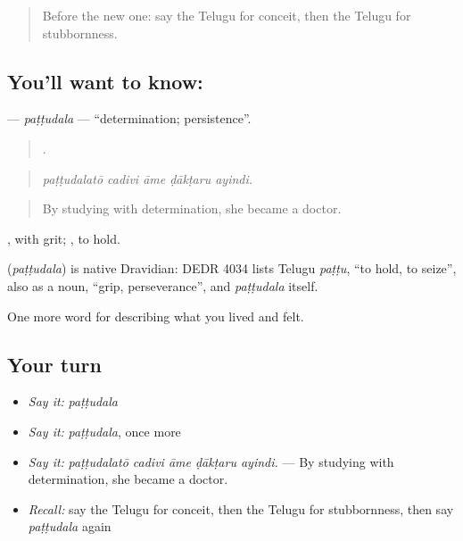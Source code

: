 \label{lesson:TE-C508-pattudala}



\begin{quote}
Before the new one: say the Telugu for conceit, then the Telugu for stubbornness.
\end{quote}

\subsection*{You'll want to know: }
\textbf{} — \emph{paṭṭudala} — \textquotedblleft{}determination; persistence\textquotedblright{}.

\begin{quote}
    .
\end{quote}

\begin{quote}
\emph{paṭṭudalatō cadivi āme ḍākṭaru ayindi.}
\end{quote}

\begin{quote}
By studying with determination, she became a doctor.
\end{quote}

, with grit; , to hold.

\begin{cousinweb}
\textbf{} (\emph{paṭṭudala}) is native Dravidian: DEDR 4034 lists Telugu \emph{paṭṭu}, \textquotedblleft{}to hold, to seize\textquotedblright{}, also as a noun, \textquotedblleft{}grip, perseverance\textquotedblright{}, and \emph{paṭṭudala} itself.
\end{cousinweb}

\begin{grammarlens}[title={What you've built}]
One more word for describing what you lived and felt.
\end{grammarlens}

\subsection*{Your turn}
\begin{itemize}
\raggedright
  \item \emph{Say it:} \emph{paṭṭudala}
  \item \emph{Say it:} \emph{paṭṭudala}, once more
  \item \emph{Say it:} \emph{paṭṭudalatō cadivi āme ḍākṭaru ayindi.} — By studying with determination, she became a doctor.
  \item \emph{Recall:} say the Telugu for conceit, then the Telugu for stubbornness, then say \emph{paṭṭudala} again
\end{itemize}

